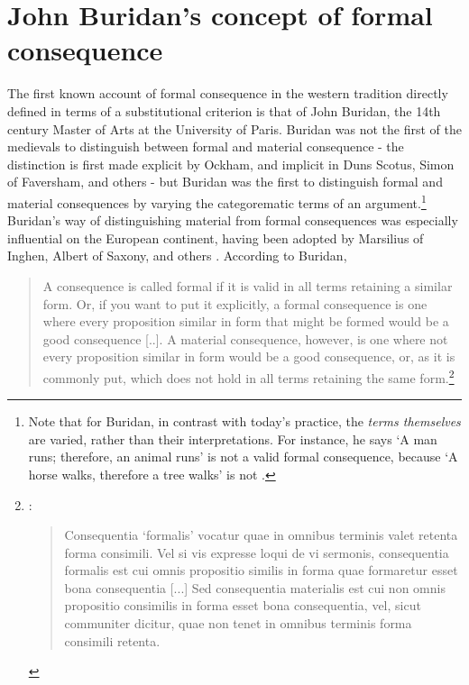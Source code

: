 		\section[Buridan's concept of formal consequence]{John Buridan's concept of formal consequence}
		The first known account of formal consequence in the western tradition directly defined in terms of a substitutional criterion is that of John Buridan, the 14th century Master of Arts at the University of Paris. Buridan was not the first of the medievals to distinguish between formal and material consequence - the distinction is first made explicit by Ockham, and implicit in Duns Scotus, Simon of Faversham, and others - but Buridan was the first to distinguish formal and material consequences by varying the categorematic terms of an argument.\footnote{Note that for Buridan, in contrast with today's practice, the \textit{terms themselves} are varied, rather than their interpretations. For instance, he says `A man runs; therefore, an animal runs' is not a valid formal consequence, because `A horse walks, therefore a tree walks' is not \cite[TC 1.4.3]{Buridan2015}.} Buridan's way of distinguishing material from formal consequences was especially influential on the European continent, having been adopted by Marsilius of Inghen, Albert of Saxony, and others \cite{DutilhNovaes2012a}. According to Buridan, 
		
		\begin{quote}
			A consequence is called formal if it is valid in all terms retaining a similar form. Or, if you want to put it explicitly, a formal consequence is one where every proposition similar in form that might be formed would be a good consequence [..]. A material consequence, however, is one where not every proposition similar in form would be a good consequence, or, as it is commonly put, which does not hold in all terms retaining the same form.\footnote{\cite[I.4, p. 68]{Buridan2015}: 
				
				\begin{quote}
					Consequentia `formalis' vocatur quae in omnibus terminis valet retenta forma consimili. Vel si vis expresse loqui de vi sermonis, consequentia formalis est cui omnis propositio similis in forma quae formaretur esset bona consequentia [...] Sed consequentia materialis est cui non omnis propositio consimilis in forma esset bona consequentia, vel, sicut communiter dicitur, quae non tenet in omnibus terminis forma consimili retenta.
				\end{quote}}
				
			\end{quote}
			
